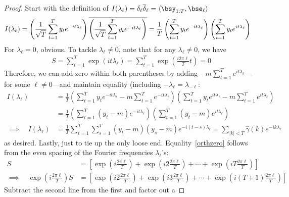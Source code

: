 \documentclass[12pt]{article}
\theoremstyle{plain}
\theoremstyle{definition}
\theoremstyle{remark}
\newcommand{\sumtT}{\sum^T_{t=1}}
\begin{document}
\begin{proof}
Start with the definition of
$I(\lambda_\ell) = \delta_\ell \overline{\delta}_\ell =
\langle \bsy_{1:T}, \bse_\ell\rangle$
\begin{align*}
  I(\lambda_\ell)
  &=
  \left(
  \frac{1}{\sqrt{T}}
  \sumtT y_t e^{-it\lambda_\ell}
  \right)
  \overline{%
  \left(
  \frac{1}{\sqrt{T}}
  \sumtT y_t e^{-it\lambda_\ell}
  \right)
  }
  =
  \frac{1}{T}
  \left(
  \sumtT y_t e^{-it\lambda_\ell}
  \right)
  \left(
  \sumtT y_t e^{it\lambda_\ell}
  \right)
\end{align*}
For $\lambda_\ell=0$, obvious. To tackle $\lambda_\ell\neq0$, note that
for any $\lambda_\ell\neq 0$, we have
\begin{align}
  S =
  \sum_{t=1}^T \exp\left({it\lambda_\ell}\right)
  =
  \sum_{t=1}^T \exp\left({\frac{i2\pi \ell}{T}t}\right)
  = 0
  \label{orthzero}
\end{align}
Therefore, we can add zero within both parentheses by adding
$-m\sum_{t=1}^T e^{it\lambda_\ell}$---for some $\ell\neq0$---and
maintain equality (including $-\lambda_\ell=\lambda_{-\ell}$:
\begin{align*}
  I(\lambda_\ell)
  &=
  \frac{1}{T}
  \left(
  \sumtT y_t e^{-it\lambda_\ell}
  - m\sumtT e^{-it\lambda_\ell}
  \right)
  \left(
  \sumtT y_t e^{it\lambda_\ell}
  - m\sumtT e^{it\lambda_\ell}
  \right)
  \\
  &=
  \frac{1}{T}
  \left(
  \sumtT
  (y_t - m)e^{-it\lambda_\ell}
  \right)
  \left(
  \sumtT
  (y_t - m)e^{it\lambda_\ell}
  \right)
  \\
  \implies\quad I(\lambda_\ell)
  &=
  \frac{1}{T}
  \sumtT
  \sum_{s=1}^T
  (y_t - m)
  (y_s - m)e^{-i(t-s)\lambda_\ell}
  = \sum_{|k|<T} \hat{\gamma}(k)e^{-ik\lambda_\ell}
\end{align*}
as desired.
Lastly, just to tie up the only loose end.
Equality~\ref{orthzero} follows from the even spacing of the
Fourier frequencies $\lambda_\ell$'s:
\begin{align*}
  S
  &=
  \left[
  \exp\left({i\frac{2\pi\ell}{T}}\right)
  + \exp\left(i2\frac{2\pi\ell}{T}\right)
  +\cdots+
  \exp\left(iT\frac{2\pi\ell}{T}\right)
  \right]
  \\
  \implies\quad
  \exp\left({i\frac{2\pi \ell}{T}}\right)S
  &=
  \left[
  \exp\left({i2\frac{2\pi\ell}{T}}\right)
  + \exp\left({i3\frac{2\pi\ell}{T}}\right)
  +\cdots+
  \exp\left({i(T+1)\frac{2\pi\ell}{T}}\right)
  \right]
\end{align*}
Subtract the second line from the first and factor out a

\end{proof}
\end{document}
